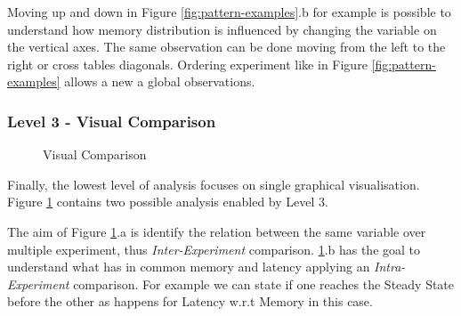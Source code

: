 Moving up and down in Figure \ref{fig:pattern-examples}.b for example is possible to understand how memory distribution is influenced by changing the variable on the vertical axes. The same observation can be done moving from the left to the right or cross tables diagonals. Ordering experiment like in Figure \ref{fig:pattern-examples} allows a new a global observations.

\subsubsection{Level 3 - Visual Comparison}\label{sec:impl-level3}

\begin{figure}[tbh]
  \centering
  \caption{Visual Comparison} 
  \label{fig:visual-comp}
\end{figure}

\noindent Finally, the lowest level of analysis focuses on single graphical visualisation. Figure \ref{fig:visual-comp} contains two possible analysis enabled by Level 3. 

The aim of Figure \ref{fig:visual-comp}.a is identify the relation between the same variable over multiple experiment, thus  \textit{Inter-Experiment} comparison. \ref{fig:visual-comp}.b has the goal to understand what has in common memory and latency applying an \textit{Intra-Experiment} comparison.  For example we can state if one reaches the Steady State before the other as happens for Latency w.r.t Memory in this case.
